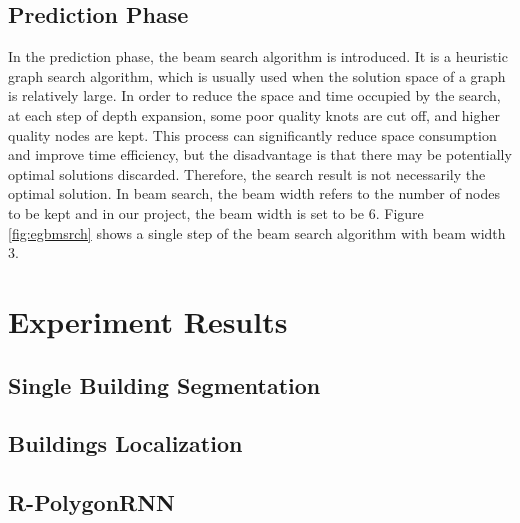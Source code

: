 \subsection{Prediction Phase}\label{prdphs}

In the prediction phase, the beam search algorithm is introduced. It is a heuristic graph search algorithm, which is usually used when the solution space of a graph is relatively large. In order to reduce the space and time occupied by the search, at each step of depth expansion, some poor quality knots are cut off, and higher quality nodes are kept. This process can significantly reduce space consumption and improve time efficiency, but the disadvantage is that there may be potentially optimal solutions discarded. Therefore, the search result is not necessarily the optimal solution. In beam search, the beam width refers to the number of nodes to be kept and in our project, the beam width is set to be 6. Figure \ref{fig:egbmsrch} shows a single step of the beam search algorithm with beam width 3.



\section{Experiment Results}\label{expres}

\subsection{Single Building Segmentation}

\subsection{Buildings Localization}

\subsection{R-PolygonRNN}
